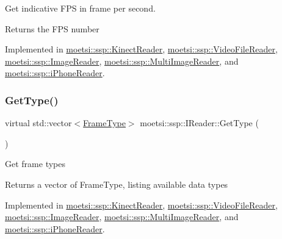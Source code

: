 Get indicative F\+PS in frame per second. \begin{DoxyReturn}{Returns}
the F\+PS number 
\end{DoxyReturn}


Implemented in \hyperlink{classmoetsi_1_1ssp_1_1KinectReader_ac88c13693ce8e2e249438ac8de8a7b3c}{moetsi\+::ssp\+::\+Kinect\+Reader}, \hyperlink{classmoetsi_1_1ssp_1_1VideoFileReader_a83359ad82898acdb75240568b182247c}{moetsi\+::ssp\+::\+Video\+File\+Reader}, \hyperlink{classmoetsi_1_1ssp_1_1ImageReader_a86adfec8106c366aaf1ec63e2a7da156}{moetsi\+::ssp\+::\+Image\+Reader}, \hyperlink{classmoetsi_1_1ssp_1_1MultiImageReader_ad0a249af66f8e1a063c3e575fc1b94cb}{moetsi\+::ssp\+::\+Multi\+Image\+Reader}, and \hyperlink{classmoetsi_1_1ssp_1_1iPhoneReader_a4bb216847a6c2ed8eb5d31788a0b8477}{moetsi\+::ssp\+::i\+Phone\+Reader}.

\mbox{\label{classmoetsi_1_1ssp_1_1IReader_a4116c1931fde7bd66133934ffdca1cce}} 
\subsubsection{\texorpdfstring{Get\+Type()}{GetType()}}
{\footnotesize\ttfamily virtual std\+::vector$<$\hyperlink{namespacemoetsi_1_1ssp_a46efdfa2cd5a28ead465dcc8006b5a87}{Frame\+Type}$>$ moetsi\+::ssp\+::\+I\+Reader\+::\+Get\+Type (\begin{DoxyParamCaption}{ }\end{DoxyParamCaption})\hspace{0.3cm}{\ttfamily [pure virtual]}}

Get frame types \begin{DoxyReturn}{Returns}
a vector of Frame\+Type, listing available data types 
\end{DoxyReturn}


Implemented in \hyperlink{classmoetsi_1_1ssp_1_1KinectReader_aef896aa686cbe1ea82dfc6aad46b6ff7}{moetsi\+::ssp\+::\+Kinect\+Reader}, \hyperlink{classmoetsi_1_1ssp_1_1VideoFileReader_a9d47af47299c5fccf766ac2d848a561b}{moetsi\+::ssp\+::\+Video\+File\+Reader}, \hyperlink{classmoetsi_1_1ssp_1_1ImageReader_af6f66957b6e3268c5336f4176c77fc73}{moetsi\+::ssp\+::\+Image\+Reader}, \hyperlink{classmoetsi_1_1ssp_1_1MultiImageReader_ad5f6cf0cfb1e64bcf569ab0bbfcce9d6}{moetsi\+::ssp\+::\+Multi\+Image\+Reader}, and \hyperlink{classmoetsi_1_1ssp_1_1iPhoneReader_a05d285ace85fc570bc2f453a0862ae56}{moetsi\+::ssp\+::i\+Phone\+Reader}.

